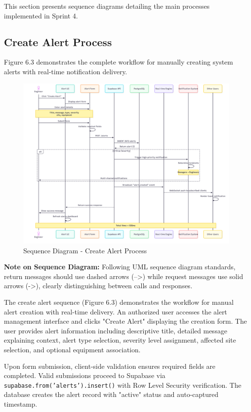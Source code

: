 This section presents sequence diagrams detailing the main processes implemented in Sprint 4.

\subsection{Create Alert Process}

Figure 6.3 demonstrates the complete workflow for manually creating system alerts with real-time notification delivery.

\begin{figure}[H]
    \centering
    \includegraphics[width=0.95\linewidth]{img/chap_06/sequence_create_alert.png}
    \caption{Sequence Diagram - Create Alert Process}
    \label{fig:sequence_create_alert}
\end{figure}

\textbf{Note on Sequence Diagram:} Following UML sequence diagram standards, return messages should use dashed arrows (-->) while request messages use solid arrows (->), clearly distinguishing between calls and responses.

The create alert sequence (Figure 6.3) demonstrates the workflow for manual alert creation with real-time delivery. An authorized user accesses the alert management interface and clicks "Create Alert" displaying the creation form. The user provides alert information including descriptive title, detailed message explaining context, alert type selection, severity level assignment, affected site selection, and optional equipment association.

Upon form submission, client-side validation ensures required fields are completed. Valid submissions proceed to Supabase via \texttt{supabase.from('alerts').insert()} with Row Level Security verification. The database creates the alert record with "active" status and auto-captured timestamp.

